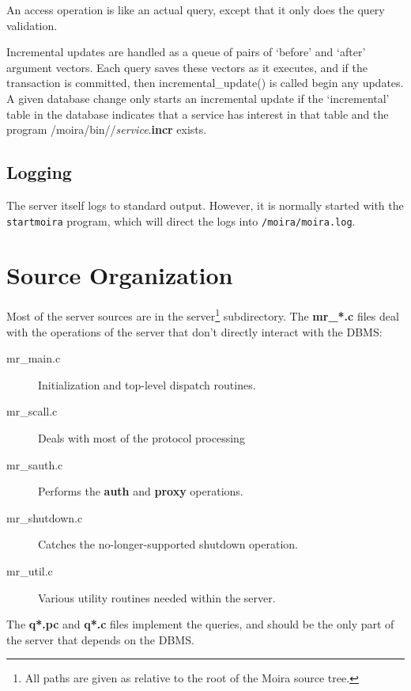 An access operation is like an actual query, except that it only does
the query validation.

Incremental updates are handled as a queue of pairs of `before' and
`after' argument vectors. Each query saves these vectors as it
executes, and if the transaction is committed, then
incremental\_update() is called begin any updates. A given database
change only starts an incremental update if the `incremental' table in
the database indicates that a service has interest in that table and
the program /moira/bin//{\it service}.{\bf incr} exists.

\subsection{Logging}

The server itself logs to standard output.  However, it is normally
started with the {\tt startmoira} program, which will direct the logs into
{\tt /moira/moira.log}.

\section{Source Organization}

Most of the server sources are in the server\footnote{All paths are
given as relative to the root of the Moira source tree.} subdirectory.
The {\bf mr\_*.c} files deal with the operations of the server that
don't directly interact with the DBMS:

\begin{description}
\item[mr\_main.c]	Initialization and top-level dispatch routines.

\item[mr\_scall.c]	Deals with most of the protocol processing

\item[mr\_sauth.c]	Performs the {\bf auth} and {\bf proxy} operations.

\item[mr\_shutdown.c]	Catches the no-longer-supported shutdown operation.

\item[mr\_util.c]	Various utility routines needed within the server.
\end{description}

The {\bf q*.pc} and {\bf q*.c} files implement the queries, and should be
the only part of the server that depends on the DBMS.

